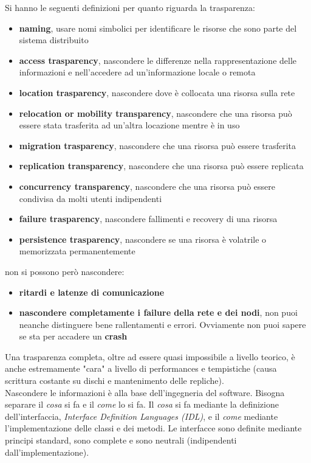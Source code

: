\documentclass[a4paper,12pt, oneside]{book}
\begin{document}
Si hanno le seguenti definizioni per quanto riguarda la trasparenza:
\begin{itemize}
\item \textbf{naming}, usare nomi simbolici per identificare le risorse che sono parte del sistema distribuito
\item \textbf{access trasparency}, nascondere le differenze nella rappresentazione delle informazioni e nell'accedere ad un'informazione locale o remota 
\item \textbf{location trasparency}, nascondere dove è collocata una risorsa sulla rete
\item  \textbf{relocation or mobility transparency}, nascondere che una risorsa può essere stata trasferita ad un'altra locazione mentre è in uso
\item \textbf{migration trasparency}, nascondere che una risorsa può essere trasferita
\item \textbf{replication transparency}, nascondere che una risorsa può essere replicata
\item \textbf{concurrency transparency}, nascondere che una risorsa può essere condivisa da molti utenti indipendenti
\item \textbf{failure trasparency}, nascondere fallimenti e recovery di una risorsa
\item \textbf{persistence trasparency}, nascondere se una risorsa è volatrile o memorizzata permanentemente
\end{itemize}
non si possono però nascondere:
\begin{itemize}
\item \textbf{ritardi e latenze di comunicazione}
\item \textbf{nascondere completamente i failure della rete e dei nodi}, non puoi neanche distinguere bene rallentamenti e errori. Ovviamente non puoi sapere se sta per accadere un \textbf{crash}
\end{itemize}
Una trasparenza completa, oltre ad essere quasi impossibile a livello teorico, è anche estremamente "cara" a livello di performances e tempistiche (causa scrittura costante su dischi e mantenimento delle repliche).\\
Nascondere le informazioni è alla base dell'ingegneria del software. Bisogna separare il \textit{cosa} si fa e il \textit{come} lo si fa. Il \textit{cosa} si fa mediante la definizione dell'interfaccia, \textit{Interface Definition Languages (IDL)}, e il \textit{come} mediante l'implementazione delle classi e dei metodi. Le interfacce sono definite mediante principi standard, sono complete e sono neutrali (indipendenti dall'implementazione).
\end{document}
